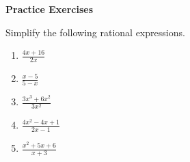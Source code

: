 \textbf{Practice Exercises}

\vspce

Simplify  the following  rational expressions.

\begin{enumerate}[label = \arabic*. ]

\item \hspce $\displaystyle \frac{4x+16}{2x}$
\item \hspce $\displaystyle \frac{x-5}{5-x}$
\item \hspce $\displaystyle \frac{3x^{3}+6x^{2}}{3x^{2}}$
\item \hspce $\displaystyle \frac{4x^{2}-4x+1}{2x-1}$
\item \hspce $\displaystyle \frac{x^{2}+5x+6}{x+3}$

\end{enumerate}

